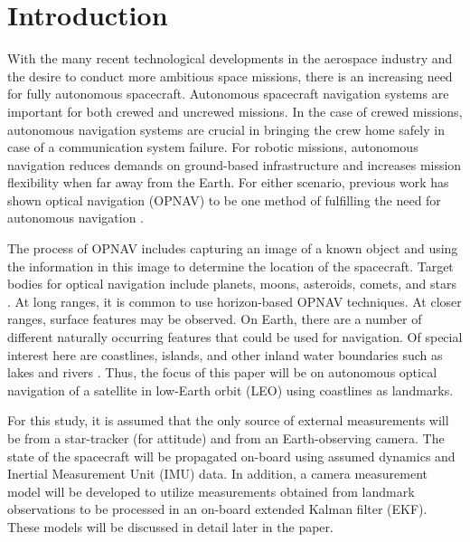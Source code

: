 \documentclass[]{aiaa-tc}%
\begin{document}
\section{Introduction}
With the many recent technological developments in the aerospace industry and the desire to conduct more ambitious space missions, there is an increasing need for fully autonomous spacecraft.  Autonomous spacecraft navigation systems are important for both crewed and uncrewed missions.  In the case of crewed missions, autonomous navigation systems are crucial in bringing the crew home safely in case of a communication system failure.  For robotic missions, autonomous navigation reduces demands on ground-based infrastructure and increases mission flexibility when far away from the Earth.  For either scenario, previous work has shown optical navigation (OPNAV) to be one method of fulfilling the need for autonomous navigation \cite{Christian:2012}.

The process of OPNAV includes capturing an image of a known object and using the information in this image to determine the location of the spacecraft.  Target bodies for optical navigation include planets, moons, asteroids, comets, and stars \cite{Owen:2011}.  At long ranges, it is common to use horizon-based OPNAV techniques.  At closer ranges, surface features may be observed.  On Earth, there are a number of different naturally occurring features that could be used for navigation.  Of special interest here are coastlines, islands, and other inland water boundaries such as lakes and rivers \cite{Liu:2004}.  Thus, the focus of this paper will be on autonomous optical navigation of a satellite in low-Earth orbit (LEO) using coastlines as landmarks.  

For this study, it is assumed that the only source of external measurements will be from a star-tracker (for attitude) and from an Earth-observing camera.  The state of the spacecraft will be propagated on-board using assumed dynamics and Inertial Measurement Unit (IMU) data.  In addition, a camera measurement model will be developed to utilize measurements obtained from landmark observations to be processed in an on-board extended Kalman filter (EKF).  These models will be discussed in detail later in the paper.

\end{document}
